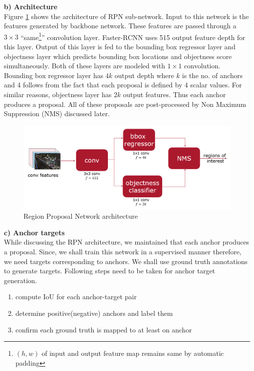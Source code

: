 \textbf{b) Architecture} \\
Figure \ref{fig:RPN-architecture} shows the architecture of RPN sub-network. Input to this network is the features generated by backbone network. These features are passed through a $3\times3$ ``same\footnote{$(h,w)$ of input and output feature map remains same by automatic padding}'' convolution layer. Faster-RCNN uses 515 output feature depth for this layer. Output of this layer is fed to the bounding box regressor layer and objectness layer which predicts bounding box locations and objectness score simultaneously. Both of these layers are modeled with $1\times1$ convolution. Bounding box regressor layer has $4k$ output depth where $k$ is the no. of anchors and 4 follows from the fact that each proposal is defined by 4 scalar values. For similar reasons, objectness layer has $2k$ output features. Thus each anchor produces a proposal. All of these proposals are post-processed by Non Maximum Suppression (NMS) discussed later. 

\begin{figure}
    \centering
    \includegraphics[width=\linewidth]{images/RPN-architecture.PNG}
    \caption[RPN architecture]{Region Proposal Network architecture}
    \label{fig:RPN-architecture}
\end{figure}

\textbf{c) Anchor targets} \\
While discussing the RPN architecture, we maintained that each anchor produces a proposal. Since, we shall train this network in a supervised manner therefore, we need targets corresponding to anchors. We shall use ground truth annotations to generate targets. Following steps need to be taken for anchor target generation.
\begin{enumerate}
    \item compute IoU for each anchor-target pair
    \item determine positive(negative) anchors and label them 
    \item confirm each ground truth is mapped to  at least on anchor 
\end{enumerate}

